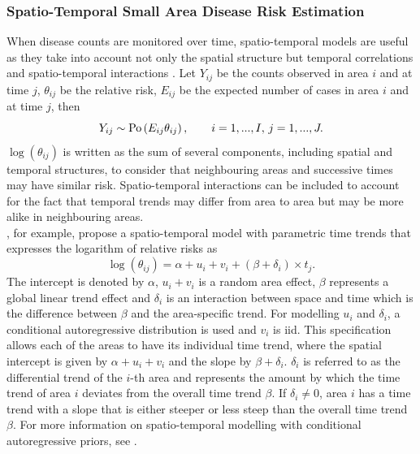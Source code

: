 \subsubsection{Spatio-Temporal Small Area Disease Risk Estimation}\label{sec:spatiotemporal}
When disease counts are monitored over time, spatio-temporal models are useful as they take into account not only the spatial structure but temporal correlations and spatio-temporal interactions \autocite[][]{martinez2008autoregressive}. Let $Y_{ij}$ be the counts observed in area $i$ and at time $j$, $\theta_{ij}$ be the relative risk, $E_{ij}$ be the expected number of cases in area $i$ and at time $j$, then
\begin{equation}
    Y_{ij}\sim\hbox{Po}\left(E_{ij}\theta_{ij}\right), \hspace{20pt} i=1,...,I,\,j=1,...,J.
\end{equation}
$\log\left(\theta_{ij}\right)$ is written as the sum of several components, including spatial and temporal structures, to consider that neighbouring areas and successive times may have similar risk. Spatio-temporal interactions can be included to account for the fact that temporal trends may differ from area to area but may be more alike in neighbouring areas. \\
\cite{bernardinelli1995bayesian}, for example, propose a spatio-temporal model with parametric time trends that expresses the logarithm of relative risks as
\begin{equation}
    \log\left(\theta_{ij}\right)=\alpha+u_i+v_i+ \left(\beta+\delta_i\right)\times t_j.
\end{equation}
The intercept is denoted by $\alpha$, $u_i+v_i$ is a random area effect, $\beta$ represents a global linear trend effect and $\delta_i$ is an interaction between space and time which is the difference between $\beta$ and the area-specific trend. For modelling $u_i$ and $\delta_i$, a conditional autoregressive distribution is used and $v_i$ is iid. This specification allows each of the areas to have its individual time trend, where the spatial intercept is given by $\alpha+u_i+v_i$ and the slope by $\beta+\delta_i$. $\delta_i$ is referred to as the differential trend of the $i$-th area and represents the amount by which the time trend of area $i$ deviates from the overall time trend $\beta$. If $\delta_i\neq 0$, area $i$ has a time trend with a slope that is either steeper or less steep than the overall time trend $\beta$. For more information on spatio-temporal modelling with conditional autoregressive priors, see \cite{lee2018spatio}.\\
